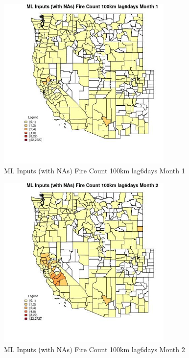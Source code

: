 \begin{figure} 
\centering  
\includegraphics[width=0.77\textwidth]{Code_Outputs/Report_ML_input_PM25_Step4_part_f_de_duplicated_aveswNAs_CountyFire_Count_100km_lag6daysmedianMonth1.jpg} 
\caption{\label{fig:Report_ML_input_PM25_Step4_part_f_de_duplicated_aveswNAsCountyFire_Count_100km_lag6daysmedianMonth1}ML Inputs (with NAs) Fire Count 100km lag6days Month 1} 
\end{figure} 
 

\begin{figure} 
\centering  
\includegraphics[width=0.77\textwidth]{Code_Outputs/Report_ML_input_PM25_Step4_part_f_de_duplicated_aveswNAs_CountyFire_Count_100km_lag6daysmedianMonth2.jpg} 
\caption{\label{fig:Report_ML_input_PM25_Step4_part_f_de_duplicated_aveswNAsCountyFire_Count_100km_lag6daysmedianMonth2}ML Inputs (with NAs) Fire Count 100km lag6days Month 2} 
\end{figure} 
 

